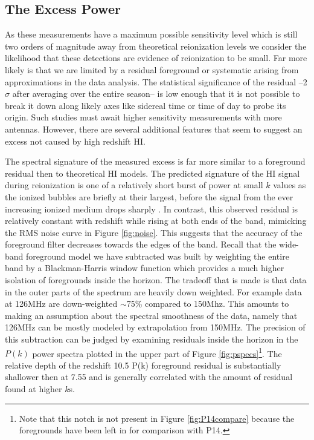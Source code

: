 \documentclass[preprint2]{aastex}
\begin{document}
\subsection{The Excess Power}

As these measurements have a maximum possible sensitivity level which is still two orders of magnitude away from theoretical reionization levels we consider the likelihood that these detections are evidence of reionization to be small. Far more likely is that we are limited by a residual foreground or systematic arising from approximations in the data analysis.  The statistical significance of the residual --2$\sigma$ after averaging over the entire season-- is low enough that it is not possible to break it down along likely axes like sidereal time or time of day to probe its origin.  Such studies must await higher sensitivity measurements with more antennas.  However, there are several additional features that seem to suggest an excess not caused by high redshift HI.

The spectral signature of the measured excess is far more similar to a foreground residual then to theoretical HI models.
The predicted signature of the HI signal during reionization is one of a relatively short burst of power at small $k$ values as the ionized bubbles are briefly at their largest, before the signal from the ever increasing ionized medium drops sharply \citep{Pritchard:2008p8123}. In contrast, this observed residual is relatively constant with redshift while rising at both ends of the band, mimicking the RMS noise curve in Figure \ref{fig:noise}.  This suggests that the accuracy of the foreground filter decreases towards the edges of the band.  Recall that the wide-band foreground model we have subtracted was built by weighting the entire band by a Blackman-Harris window function which provides a much higher isolation of foregrounds inside the horizon. The tradeoff that is made is that data in the outer parts of the spectrum are heavily down weighted.  For example data at 126MHz are down-weighted $\sim$75\% compared to 150Mhz.  This amounts to making an assumption about the spectral smoothness of the data, namely that 126MHz can be mostly modeled by extrapolation from 150MHz.  The precision of this subtraction can be judged by examining residuals inside the horizon in the $P(k)$ power spectra plotted in the upper part of Figure \ref{fig:pspecs}\footnote{Note that this notch is not present in Figure \ref{fig:P14compare} because the foregrounds have been left in for comparison with P14.}.  The relative depth of the redshift 10.5 P(k) foreground residual is substantially shallower then at 7.55 and is generally correlated with the amount of residual found at higher $k$s.
\end{document}
